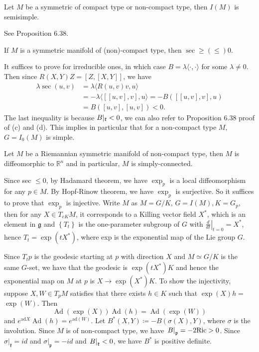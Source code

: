 \begin{proposition}
	Let $M$ be a symmetric of compact type or non-compact type,
	then $I(M)$ is semisimple.
\end{proposition}
\bproof
See \cite{Ziller} Proposition 6.38.
\eproof
\begin{proposition}
	If $M$ is a symmetric manifold of (non)-compact type, then
	$\sec \geq(\leq) 0$.
\end{proposition}
\bproof
It suffices to prove for irreducible ones, in which case
$B=\lambda\langle\cdot,\cdot\rangle$ for some
$\lambda \neq 0$. Then since $R(X, Y) Z=[Z,[X, Y]]$, we have
\[
\begin{aligned}
	\lambda \sec (u, v) & = \lambda\langle R(u, v) v, u\rangle
	\\
	&=-\lambda\langle[[u, v], v], u\rangle=-B([[u, v], v], u) \\
	&=B([u, v],[u, v]) < 0.
\end{aligned}
\]
The last inequality is because $B|_{{\mathfrak k}}<0$, we can also refer
to \cite{Ziller} Proposition 6.38 proof of (c) and (d).
\eproof
This implies in particular that for a non-compact type $M$, $G =
I_0(M)$ is simple.  
\begin{theorem}
	Let $M$ be a Riemannian symmetric manifold of non-compact
	type, then $M$
	is diffeomorphic to $\mathbb{R}^{n}$ and in particular, $M$
	is simply-connected.
\end{theorem}
\bproof
Since sec $\leq 0$, by Hadamard theorem, we have $\exp _{p}$ is
a local diffeomorphism for any $p \in M$. By Hopf-Rinow theorem,
we have $\exp _{p}$ is surjective. So it suffices to prove that
$\exp _{p}$ is injective. Write $M$ as $M = G / K$, $G = I(M),
K=G_{p}$, then for any $X \in T_{e K} M$, it corresponds to a
Killing vector field $X^{*}$, which is an element in
$\mathfrak{g}$ and $\left\{T_{t}\right\}$ is the one-parameter
subgroup of $G$ with $\left.\frac{d}{d t}\right|_{t=0} = X^{*}$,
hence $T_{t} = \exp \left(t X^{*}\right)$, where exp is the
exponential map of the Lie group $G$.

Since $T_{t} p$ is the geodesic starting at $p$ with direction
$X$ and $M \simeq G / K$ is the same $G$-set, we have that the
geodesic is $\exp \left(t X^{*}\right) K$ and hence the
exponential map on $M$ at $p$ is $X \rightarrow \exp
\left(X^{*}\right) K$. To show the injectivity, suppose $X, W
\in T_{p} M$ satisfies that there exists $h \in K$ such that
$\exp (X) h = $ $\exp \left(W\right)$. Then
\[
\operatorname{Ad}(\exp (X)) \operatorname{Ad}(h) =
\operatorname{Ad}\left(\exp \left(W\right)\right)
\]
and $e^{\mathrm{ad} X} \operatorname{Ad}(h) =
e^{\mathrm{ad}\left(W\right)}$. Let $B^{*}(X, Y)\coloneq -B(\sigma(X),
Y)$, where $\sigma$ is the
involution. Since $M$ is of non-compact type, we have
$\left.B\right|_{{\mathfrak p}} = -2 \mathrm{Ric}>0$. Since
$\left.\sigma\right|_{\mathfrak{k}} = i d$ and
$\left.\sigma\right|_{\mathfrak{p}} =-i d$ and
$\left.B\right|_{{\mathfrak k}}<0$, we have $B^{*}$ is positive definite.

